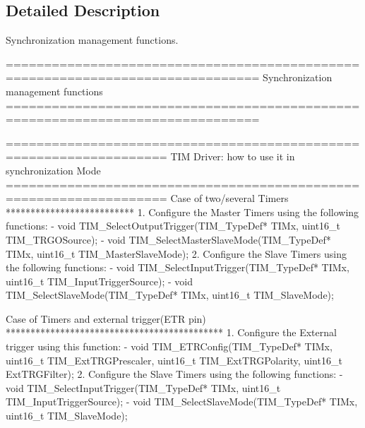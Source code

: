 \subsection{Detailed Description}
Synchronization management functions. \begin{DoxyVerb} ===============================================================================
                       Synchronization management functions
 ===============================================================================  
                   
       ===================================================================      
              TIM Driver: how to use it in synchronization Mode
       =================================================================== 
       Case of two/several Timers
       **************************
       1. Configure the Master Timers using the following functions:
          - void TIM_SelectOutputTrigger(TIM_TypeDef* TIMx, uint16_t TIM_TRGOSource); 
          - void TIM_SelectMasterSlaveMode(TIM_TypeDef* TIMx, uint16_t TIM_MasterSlaveMode);  
       2. Configure the Slave Timers using the following functions: 
          - void TIM_SelectInputTrigger(TIM_TypeDef* TIMx, uint16_t TIM_InputTriggerSource);  
          - void TIM_SelectSlaveMode(TIM_TypeDef* TIMx, uint16_t TIM_SlaveMode); 
          
       Case of Timers and external trigger(ETR pin)
       ********************************************       
       1. Configure the External trigger using this function:
          - void TIM_ETRConfig(TIM_TypeDef* TIMx, uint16_t TIM_ExtTRGPrescaler, uint16_t TIM_ExtTRGPolarity,
                               uint16_t ExtTRGFilter);
       2. Configure the Slave Timers using the following functions: 
          - void TIM_SelectInputTrigger(TIM_TypeDef* TIMx, uint16_t TIM_InputTriggerSource);  
          - void TIM_SelectSlaveMode(TIM_TypeDef* TIMx, uint16_t TIM_SlaveMode); \end{DoxyVerb}
 

